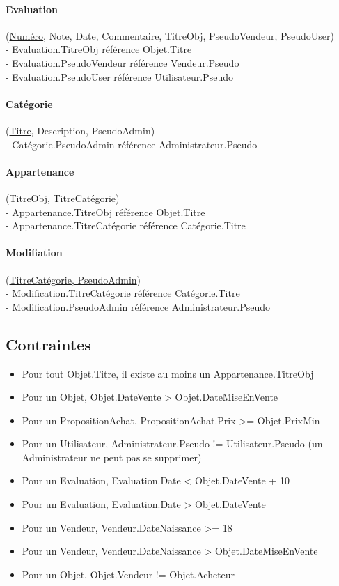 \documentclass{article}
\begin{document}
\paragraph{Evaluation} (\underline{Numéro}, Note, Date, Commentaire, TitreObj, PseudoVendeur, PseudoUser)\\
\indent - Evaluation.TitreObj référence Objet.Titre\\
\indent - Evaluation.PseudoVendeur référence Vendeur.Pseudo\\
\indent - Evaluation.PseudoUser référence Utilisateur.Pseudo


\paragraph{Catégorie} (\underline{Titre}, Description, PseudoAdmin)\\
\indent - Catégorie.PseudoAdmin référence Administrateur.Pseudo


\paragraph{Appartenance} (\underline{TitreObj, TitreCatégorie})\\
\indent - Appartenance.TitreObj référence Objet.Titre\\
\indent - Appartenance.TitreCatégorie référence Catégorie.Titre


\paragraph{Modifiation} (\underline{TitreCatégorie, PseudoAdmin})\\
\indent - Modification.TitreCatégorie référence Catégorie.Titre\\
\indent - Modification.PseudoAdmin référence Administrateur.Pseudo


\subsection{Contraintes}

\begin{itemize}
\item Pour tout Objet.Titre, il existe au moins un Appartenance.TitreObj
\item Pour un Objet, Objet.DateVente > Objet.DateMiseEnVente
\item Pour un PropositionAchat, PropositionAchat.Prix >= Objet.PrixMin
\item Pour un Utilisateur, Administrateur.Pseudo != Utilisateur.Pseudo (un Administrateur ne peut pas se supprimer)
\item Pour un Evaluation, Evaluation.Date < Objet.DateVente + 10
\item Pour un Evaluation, Evaluation.Date > Objet.DateVente
\item Pour un Vendeur, Vendeur.DateNaissance >= 18
\item Pour un Vendeur, Vendeur.DateNaissance > Objet.DateMiseEnVente
\item Pour un Objet, Objet.Vendeur != Objet.Acheteur
\end{itemize}
\end{document}
